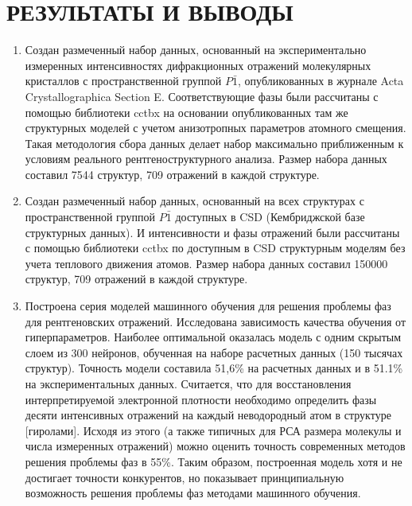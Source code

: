 \documentclass{article}
\begin{document}





\newpage
\section{РЕЗУЛЬТАТЫ И ВЫВОДЫ}

\begin{enumerate}
  \item  Создан размеченный набор данных, основанный на экспериментально измеренных интенсивностях дифракционных отражений молекулярных кристаллов с пространственной группой \(P\bar{1}\), опубликованных в журнале Acta Crystallographica Section E. Соответствующие фазы были рассчитаны с помощью библиотеки cctbx на основании опубликованных там же структурных моделей с учетом анизотропных параметров атомного смещения. Такая методология сбора данных делает набор максимально приближенным к условиям реального рентгеноструктурного анализа. Размер набора данных составил 7544 структур, 709 отражений в каждой структуре.

  \item Создан размеченный  набор данных, основанный на всех структурах с пространственной группой \(P\bar{1}\) доступных в CSD (Кембриджской базе структурных данных). И интенсивности и фазы отражений были рассчитаны с помощью библиотеки cctbx по доступным в CSD структурным моделям без учета теплового движения атомов. Размер набора данных составил 150000 структур, 709 отражений в каждой структуре.

  \item Построена серия моделей машинного обучения для решения проблемы фаз для рентгеновских отражений. Исследована зависимость качества обучения от гиперпараметров. Наиболее оптимальной оказалась модель с одним скрытым слоем из 300 нейронов, обученная на наборе расчетных данных (150 тысячах структур). Точность модели составила 51,6\% на расчетных данных и в 51.1\% на экспериментальных данных. Считается, что  для восстановления интерпретируемой электронной плотности необходимо определить фазы десяти интенсивных отражений на каждый неводородный атом в структуре [гиролами]. Исходя из этого (а также типичных для РСА размера молекулы и числа измеренных отражений) можно оценить точность современных методов решения проблемы фаз в 55\%. Таким образом, построенная модель хотя и не достигает точности конкурентов, но показывает принципиальную возможность решения проблемы фаз методами машинного обучения.


\end{enumerate}
\end{document}
